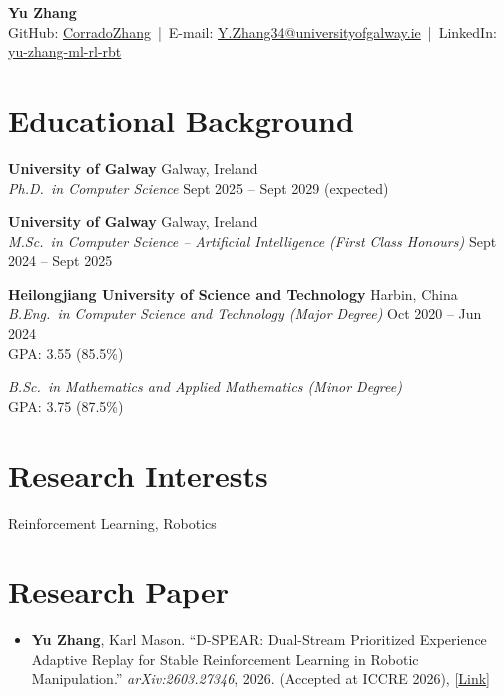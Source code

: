 \documentclass[10pt,a4paper]{article}
\begin{document}
\begin{center}
    {\LARGE \textbf{Yu Zhang}}\\[0.4em]
    GitHub: \href{https://github.com/CorradoZhang}{CorradoZhang} \,|\, E-mail: \href{mailto:Y.Zhang34@universityofgalway.ie}{Y.Zhang34@universityofgalway.ie} \,|\, LinkedIn: \href{https://www.linkedin.com/in/yu-zhang-ml-rl-rbt/}{yu-zhang-ml-rl-rbt}
\end{center}

\section*{Educational Background}

\textbf{University of Galway} \hfill Galway, Ireland\\
\textit{Ph.D.\ in Computer Science} \hfill Sept 2025 -- Sept 2029 (expected)

\textbf{University of Galway} \hfill Galway, Ireland\\
\textit{M.Sc.\ in Computer Science -- Artificial Intelligence (First Class Honours)} \hfill Sept 2024 -- Sept 2025

\textbf{Heilongjiang University of Science and Technology} \hfill Harbin, China\\
\textit{B.Eng.\ in Computer Science and Technology (Major Degree)} \hfill Oct 2020 -- Jun 2024\\
GPA: 3.55 (85.5\%)

\textit{B.Sc.\ in Mathematics and Applied Mathematics (Minor Degree)}\\
GPA: 3.75 (87.5\%)

\section*{Research Interests}

Reinforcement Learning, Robotics

\section*{Research Paper}

\begin{itemize}
    \item \textbf{Yu Zhang}, Karl Mason. ``D-SPEAR: Dual-Stream Prioritized Experience Adaptive Replay for Stable Reinforcement Learning in Robotic Manipulation.'' \textit{arXiv:2603.27346}, 2026. (Accepted at ICCRE 2026), [\href{https://arxiv.org/abs/2603.27346}{Link}]
\end{itemize}
\end{document}
